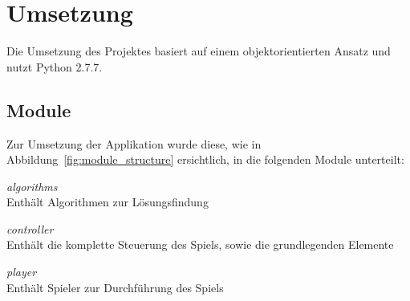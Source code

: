 \section{Umsetzung}
\label{sec:implementation}

Die Umsetzung des Projektes basiert auf einem objektorientierten Ansatz und nutzt Python 2.7.7.

\subsection{Module}
\label{subsec:modules}
Zur Umsetzung der Applikation wurde diese, wie in Abbildung~\ref{fig:module_structure} ersichtlich, in die folgenden Module unterteilt:

\begin{compactitem}
\item \textit{algorithms}\\
    Enthält Algorithmen zur Lösungsfindung
\item \textit{controller}\\
    Enthält die komplette Steuerung des Spiels, sowie die grundlegenden Elemente
\item \textit{player}\\
    Enthält Spieler zur Durchführung des Spiels
\end{compactitem}

